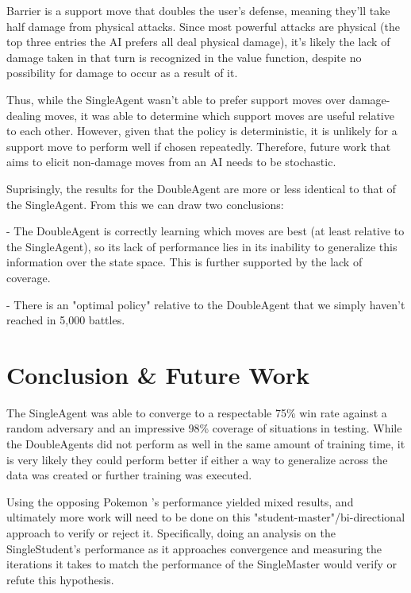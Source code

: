 \documentclass{article}
\begin{document}
\quad Barrier is a support move that doubles the user's defense, meaning they'll take half damage from physical attacks. Since most powerful attacks are physical (the top three entries the AI prefers all deal physical damage), it's likely the lack of damage taken in that turn is recognized in the value function, despite no possibility for damage to occur as a result of it.

\quad Thus, while the SingleAgent wasn't able to prefer support moves over damage-dealing moves, it was able to determine which support moves are useful relative to each other. However, given that the policy is deterministic, it is unlikely for a support move to perform well if chosen repeatedly. Therefore, future work that aims to elicit non-damage moves from an AI needs to be stochastic.

\quad Suprisingly, the results for the DoubleAgent are more or less identical to that of the SingleAgent. From this we can draw two conclusions:

\quad\quad - The DoubleAgent is correctly learning which moves are best (at least relative to the SingleAgent), so its lack of performance lies in its inability to generalize this information over the state space. This is further supported by the lack of coverage.

\quad\quad - There is an "optimal policy" relative to the DoubleAgent that we simply haven't reached in 5,000 battles.


\section{Conclusion \& Future Work}
\label{sec:conclusion}

\quad The SingleAgent was able to converge to a respectable 75\% win rate against a random adversary and an impressive 98\% coverage of situations in testing. While the DoubleAgents did not perform as well in the same amount of training time, it is very likely they could perform better if either a way to generalize across the data was created or further training was executed.

\quad Using the opposing Pokemon 's performance yielded mixed results, and ultimately more work will need to be done on this "student-master"/bi-directional approach to verify or reject it. Specifically, doing an analysis on the SingleStudent's performance as it approaches convergence and measuring the iterations it takes to match the performance of the SingleMaster would verify or refute this hypothesis.
\end{document}
